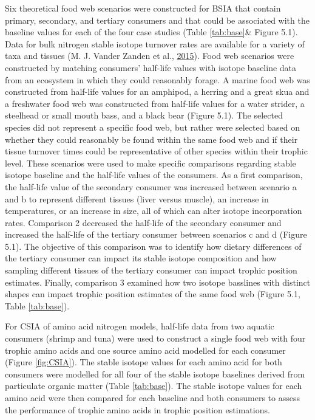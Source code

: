 \documentclass [11pt, proquest] {uwthesis}[2015/03/03]
\begin{document}
Six theoretical food web scenarios were constructed for BSIA that
contain primary, secondary, and tertiary consumers and that could be
associated with the baseline values for each of the four case studies
(Table \ref{tab:base}\& Figure 5.1). Data for bulk nitrogen stable
isotope turnover rates are available for a variety of taxa and tissues
(M. J. Vander Zanden et al.,
\protect\hyperlink{ref-VanderZanden2015}{2015}). Food web scenarios were
constructed by matching consumers' half-life values with isotope
baseline data from an ecosystem in which they could reasonably forage. A
marine food web was constructed from half-life values for an amphipod, a
herring and a great skua and a freshwater food web was constructed from
half-life values for a water strider, a steelhead or small mouth bass,
and a black bear (Figure 5.1). The selected species did not represent a
specific food web, but rather were selected based on whether they could
reasonably be found within the same food web and if their tissue
turnover times could be representative of other species within their
trophic level. These scenarios were used to make specific comparisons
regarding stable isotope baseline and the half-life values of the
consumers. As a first comparison, the half-life value of the secondary
consumer was increased between scenario a and b to represent different
tissues (liver versus muscle), an increase in temperatures, or an
increase in size, all of which can alter isotope incorporation rates.
Comparison 2 decreased the half-life of the secondary consumer and
increased the half-life of the tertiary consumer between scenarios c and
d (Figure 5.1). The objective of this comparison was to identify how
dietary differences of the tertiary consumer can impact its stable
isotope composition and how sampling different tissues of the tertiary
consumer can impact trophic position estimates. Finally, comparison 3
examined how two isotope basslines with distinct shapes can impact
trophic position estimates of the same food web (Figure 5.1, Table
\ref{tab:base}).

For CSIA of amino acid nitrogen models, half-life data from two aquatic
consumers (shrimp and tuna) were used to construct a single food web
with four trophic amino acids and one source amino acid modelled for
each consumer (Figure \ref{fig:CSIA}). The stable isotope values for
each amino acid for both consumers were modelled for all four of the
stable isotope baselines derived from particulate organic matter (Table
\ref{tab:base}). The stable isotope values for each amino acid were then
compared for each baseline and both consumers to assess the performance
of trophic amino acids in trophic position estimations.
\end{document}
